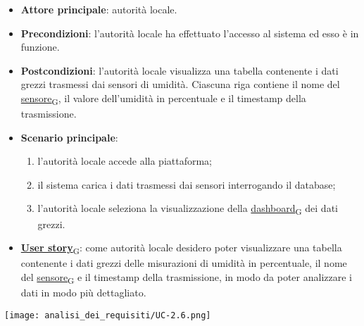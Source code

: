 \newpage
{}
\begin{itemize}
	\item \textbf{Attore principale}: autorità locale.
	\item \textbf{Precondizioni}: l'autorità locale ha effettuato l'accesso al sistema ed esso è in funzione.
	\item \textbf{Postcondizioni}: l'autorità locale visualizza una tabella contenente i dati grezzi trasmessi dai sensori di umidità.
	      Ciascuna riga contiene il nome del \href{https://7last.github.io/docs/pb/documentazione-interna/glossario\#sensore}{sensore\textsubscript{G}}, il valore dell'umidità in percentuale e il timestamp della trasmissione.
	\item \textbf{Scenario principale}:
	      \begin{enumerate}
		      \item l'autorità locale accede alla piattaforma;
		      \item il sistema carica i dati trasmessi dai sensori interrogando il database;
		      \item l'autorità locale seleziona la visualizzazione della \href{https://7last.github.io/docs/pb/documentazione-interna/glossario\#dashboard}{dashboard\textsubscript{G}} dei dati grezzi.
	      \end{enumerate}
	\item \href{https://7last.github.io/docs/pb/documentazione-interna/glossario\#user-story}{\textbf{User story}\textsubscript{G}}:
	      come autorità locale desidero poter visualizzare una tabella contenente i dati grezzi delle misurazioni di umidità in percentuale,
	      il nome del \href{https://7last.github.io/docs/pb/documentazione-interna/glossario\#sensore}{sensore\textsubscript{G}} e il timestamp della trasmissione, in modo da poter analizzare i dati in modo più dettagliato.
\end{itemize}
\begin{center}
	\texttt{[image: analisi\_dei\_requisiti/UC-2.6.png]}
\end{center}

